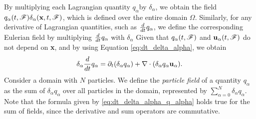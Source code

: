 By multiplying each Lagrangian quantity $q_\alpha$​ by $\delta_\alpha$​, we obtain the field $q_\alpha(t,\mathscr{F})\delta_\alpha(\textbf{x},t,\mathscr{F})$, which is defined over the entire domain $\Omega$. 
Similarly, for any derivative of Lagrangian quantities, such as $\frac{d}{dt} q_\alpha$​, we define the corresponding Eulerian field by multiplying $\frac{d}{dt} q_\alpha$ with $\delta_\alpha$ 
Given that $q_\alpha(t,\mathscr{F})$ and $\textbf{u}_\alpha(t,\mathscr{F})$ do not depend on \textbf{x}, and by using Equation \ref{eq:dt_delta_alpha}, we obtain
\begin{equation}
    \delta_\alpha \frac{d}{dt} q_\alpha
    = \partial_t (\delta_\alpha q_\alpha)
    + \mathbf{\nabla}\cdot (\delta_\alpha q_\alpha \textbf{u}_\alpha).
    \label{eq:dt_delta_alpha_q_alpha}
\end{equation}
Consider a domain with $N$ particles. We define the \textit{particle field} of a quantity $q_\alpha$​ as the sum of $\delta_\alpha q_\alpha$ over all particles in the domain, represented by $\displaystyle\sum_{\alpha=0}^N \delta_\alpha q_\alpha$​. 
Note that the formula given by \ref{eq:dt_delta_alpha_q_alpha} holds true for the sum of fields, since the derivative and sum operators are commutative.

